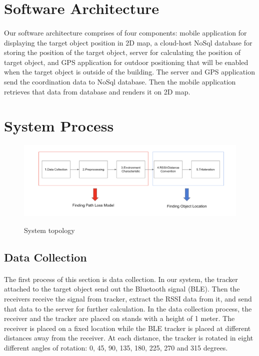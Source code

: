 \section{Software Architecture}

\paragraph{}Our software architecture comprises of four components: mobile application for displaying the target object position in 2D map, a cloud-host NoSql database for storing the position of the target object, server for calculating the position of target object, and GPS application for outdoor positioning that will be enabled when the target object is outside of the
building. The server and GPS application send the coordination data to NoSql database. Then the mobile application retrieves that data from database and renders it on 2D map. 
\section{System Process}
\begin{figure}[h]
\centering
\includegraphics[width=\textwidth]{Image/systemprocess.png}
\label{system_topo}
\caption{System topology}
\end{figure}

\subsection{Data Collection}
\paragraph{}The first process of this section is data collection. In our system, the tracker
attached to the target object send out the Bluetooth signal (BLE). Then the receivers receive the signal from tracker, extract the RSSI data from it, and send that data to the server for further calculation. In the data collection process, the receiver and the tracker are placed on stands with a height of 1 meter. The receiver is placed on a fixed location while the BLE tracker is placed at different distances away from the receiver. At each distance, the tracker is rotated in eight different angles of rotation: 0, 45, 90, 135, 180, 225, 270 and 315 degrees.

